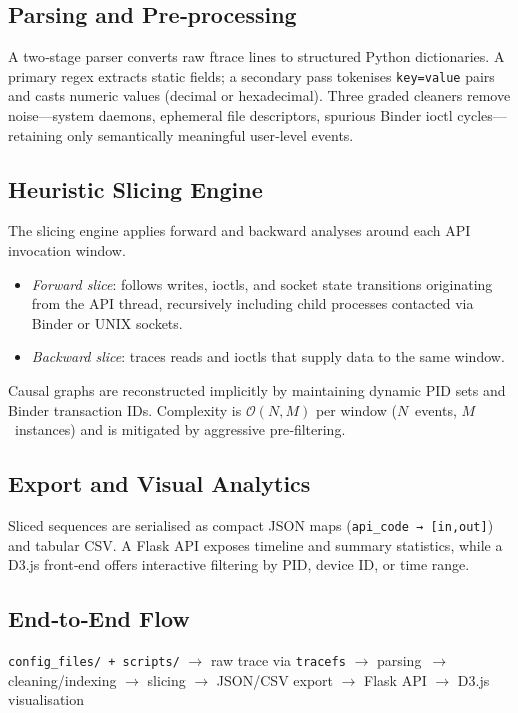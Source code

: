 \documentclass[a4paper,12pt]{report}
\begin{document}
\subsection{Parsing and Pre‑processing}
A two‑stage parser converts raw ftrace lines to structured Python dictionaries. A primary regex extracts static fields; a secondary pass tokenises \texttt{key=value} pairs and casts numeric values (decimal or hexadecimal). Three graded cleaners remove noise—system daemons, ephemeral file descriptors, spurious Binder ioctl cycles—retaining only semantically meaningful user‑level events.

\subsection{Heuristic Slicing Engine}
The slicing engine applies forward and backward analyses around each API invocation window.
\begin{itemize}
\item \emph{Forward slice}: follows writes, ioctls, and socket state transitions originating from the API thread, recursively including child processes contacted via Binder or UNIX sockets.
\item \emph{Backward slice}: traces reads and ioctls that supply data to the same window.
\end{itemize}
Causal graphs are reconstructed implicitly by maintaining dynamic PID sets and Binder transaction IDs. Complexity is $\mathcal{O}(N,M)$ per window ($N$ events, $M$ instances) and is mitigated by aggressive pre‑filtering.

\subsection{Export and Visual Analytics}
Sliced sequences are serialised as compact JSON maps (\texttt{api\_code → [in,out]}) and tabular CSV. A Flask API exposes timeline and summary statistics, while a D3.js front‑end offers interactive filtering by PID, device ID, or time range.

\subsection{End‑to‑End Flow}
\begin{center}
\texttt{config\_files/ + scripts/} $\rightarrow$ raw trace via \texttt{tracefs} $\rightarrow$ parsing $\rightarrow$ cleaning/indexing $\rightarrow$ slicing $\rightarrow$ JSON/CSV export $\rightarrow$ Flask API $\rightarrow$ D3.js visualisation
\end{center}
\end{document}
